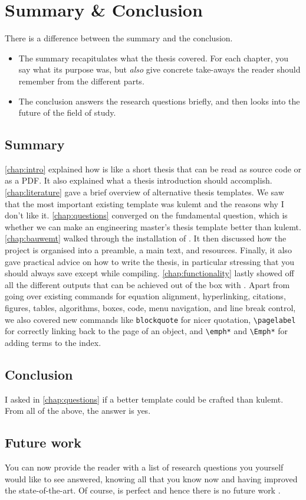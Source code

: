 \chapter{Summary \& Conclusion}
There is a difference between the summary and the conclusion.
\begin{itemize}
	\item The summary recapitulates what the thesis covered. For each chapter, you say what its purpose was, but \emph{also} give concrete take-aways the reader should remember from the different parts.
	\item The conclusion answers the research questions briefly, and then looks into the future of the field of study.
\end{itemize}

\section{Summary}
\autoref{chap:intro} explained how \repo is like a short thesis that can be read as source code or as a PDF. It also explained what a thesis introduction should accomplish.
\segsep
\autoref{chap:literature} gave a brief overview of alternative thesis templates. We saw that the most important existing template was kulemt and the reasons why I don't like it.
\segsep
\autoref{chap:questions} converged on the fundamental question, which is whether we can make an engineering master's thesis template better than kulemt.
\segsep 
\autoref{chap:bauwemt} walked through the installation of \repo. It then discussed how the project is organised into a preamble, a main text, and resources. Finally, it also gave practical advice on how to write the thesis, in particular stressing that you should always save except while compiling.
\segsep
\autoref{chap:functionality} lastly showed off all the different outputs that can be achieved out of the box with \repo. Apart from going over existing commands for equation alignment, hyperlinking, citations, figures, tables, algorithms, boxes, code, menu navigation, and line break control, we also covered new commands like \verb|blockquote| for nicer quotation, \verb|\pagelabel| for correctly linking back to the page of an object, and \verb|\emph*| and \verb|\Emph*| for adding terms to the index.

\section{Conclusion}
I asked in \autoref{chap:questions} if a better template could be crafted than kulemt. From all of the above, the answer is yes.

\section{Future work}
You can now provide the reader with a list of research questions you yourself would like to see answered, knowing all that you know now and having improved the state-of-the-art. Of course, \repo is perfect and hence there is no future work \co{;-)}.

